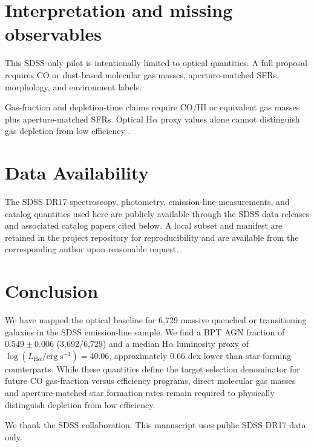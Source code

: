 \documentclass[twocolumn]{aastex631}
\begin{document}
\section{Interpretation and missing observables}\label{sec:missing}
This SDSS-only pilot is intentionally limited to optical quantities. A full proposal requires CO or dust-based molecular gas masses, aperture-matched SFRs, morphology, and environment labels.

Gas-fraction and depletion-time claims require CO/HI or equivalent gas masses plus aperture-matched SFRs. Optical H$\alpha$ proxy values alone cannot distinguish gas depletion from low efficiency \citep{coldgass1, coldgass2, xcoldgass2017, xgass2018}.


\section{Data Availability}\label{sec:data-avail}
The SDSS DR17 spectroscopy, photometry, emission-line measurements, and catalog quantities used here are publicly available through the SDSS data releases and associated catalog papers cited below. A local subset and manifest are retained in the project repository for reproducibility and are available from the corresponding author upon reasonable request.

\section{Conclusion}\label{sec:conclusion}
We have mapped the optical baseline for 6,729 massive quenched or transitioning galaxies in the SDSS emission-line sample. We find a BPT AGN fraction of $0.549 \pm 0.006$ (3,692/6,729) and a median H$\alpha$ luminosity proxy of $\log(L_{\mathrm{H}\alpha} / \mathrm{erg~s}^{-1}) = 40.06$, approximately 0.66 dex lower than star-forming counterparts. While these quantities define the target selection denominator for future CO gas-fraction versus efficiency programs, direct molecular gas masses and aperture-matched star formation rates remain required to physically distinguish depletion from low efficiency.

\begin{acknowledgments}
We thank the SDSS collaboration. This manuscript uses public SDSS DR17 data only.
\end{acknowledgments}
\end{document}
